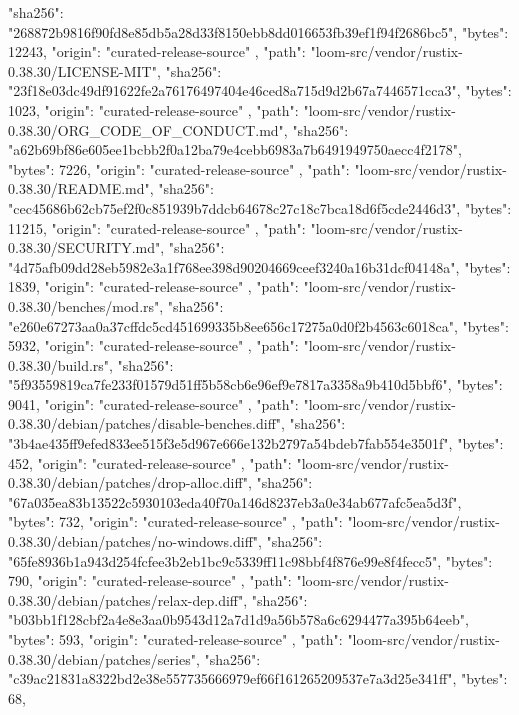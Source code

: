 {{      "sha256": "268872b9816f90fd8e85db5a28d33f8150ebb8dd016653fb39ef1f94f2686bc5",
      "bytes": 12243,
      "origin": "curated-release-source"
    },
    {
      "path": "loom-src/vendor/rustix-0.38.30/LICENSE-MIT",
      "sha256": "23f18e03dc49df91622fe2a76176497404e46ced8a715d9d2b67a7446571cca3",
      "bytes": 1023,
      "origin": "curated-release-source"
    },
    {
      "path": "loom-src/vendor/rustix-0.38.30/ORG_CODE_OF_CONDUCT.md",
      "sha256": "a62b69bf86e605ee1bcbb2f0a12ba79e4cebb6983a7b6491949750aecc4f2178",
      "bytes": 7226,
      "origin": "curated-release-source"
    },
    {
      "path": "loom-src/vendor/rustix-0.38.30/README.md",
      "sha256": "cec45686b62cb75ef2f0c851939b7ddcb64678c27c18c7bca18d6f5cde2446d3",
      "bytes": 11215,
      "origin": "curated-release-source"
    },
    {
      "path": "loom-src/vendor/rustix-0.38.30/SECURITY.md",
      "sha256": "4d75afb09dd28eb5982e3a1f768ee398d90204669ceef3240a16b31dcf04148a",
      "bytes": 1839,
      "origin": "curated-release-source"
    },
    {
      "path": "loom-src/vendor/rustix-0.38.30/benches/mod.rs",
      "sha256": "e260e67273aa0a37cffdc5cd451699335b8ee656c17275a0d0f2b4563c6018ca",
      "bytes": 5932,
      "origin": "curated-release-source"
    },
    {
      "path": "loom-src/vendor/rustix-0.38.30/build.rs",
      "sha256": "5f93559819ca7fe233f01579d51ff5b58cb6e96ef9e7817a3358a9b410d5bbf6",
      "bytes": 9041,
      "origin": "curated-release-source"
    },
    {
      "path": "loom-src/vendor/rustix-0.38.30/debian/patches/disable-benches.diff",
      "sha256": "3b4ae435ff9efed833ee515f3e5d967e666e132b2797a54bdeb7fab554e3501f",
      "bytes": 452,
      "origin": "curated-release-source"
    },
    {
      "path": "loom-src/vendor/rustix-0.38.30/debian/patches/drop-alloc.diff",
      "sha256": "67a035ea83b13522c5930103eda40f70a146d8237eb3a0e34ab677afc5ea5d3f",
      "bytes": 732,
      "origin": "curated-release-source"
    },
    {
      "path": "loom-src/vendor/rustix-0.38.30/debian/patches/no-windows.diff",
      "sha256": "65fe8936b1a943d254fcfee3b2eb1bc9c5339ff11c98bbf4f876e99e8f4fecc5",
      "bytes": 790,
      "origin": "curated-release-source"
    },
    {
      "path": "loom-src/vendor/rustix-0.38.30/debian/patches/relax-dep.diff",
      "sha256": "b03bb1f128cbf2a4e8e3aa0b9543d12a7d1d9a56b578a6c6294477a395b64eeb",
      "bytes": 593,
      "origin": "curated-release-source"
    },
    {
      "path": "loom-src/vendor/rustix-0.38.30/debian/patches/series",
      "sha256": "c39ac21831a8322bd2e38e557735666979ef66f161265209537e7a3d25e341ff",
      "bytes": 68,
}}
